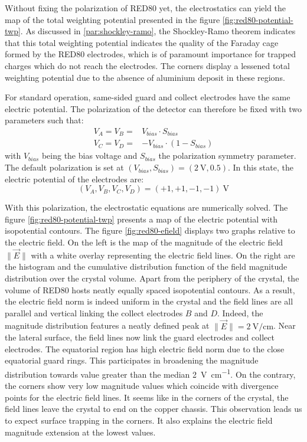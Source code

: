 Without fixing the polarization of RED80 yet, the electrostatics can yield the map of the total weighting potential presented in the figure \ref{fig:red80-potential-twp}.  As discussed in \ref{par:shockley-ramo}, the Shockley-Ramo theorem indicates that this total weighting potential indicates the quality of the Faraday cage formed by the RED80 electrodes, which is of paramount importance for trapped charges which do not reach the electrodes.
The corners display a lessened total weighting potential due to the absence of aluminium deposit in these regions.

For standard operation, same-sided guard and collect electrodes have the same electric potential. The polarization of the detector can therefore be fixed with two parameters such that:
\begin{align}
\label{eq:red80-polarization}
V_A = V_B = & V_{bias} \cdot S_{bias} \\
V_C = V_D = & - V_{bias} \cdot \left( 1 - S_{bias} \right)
\end{align}
with $V_{bias}$ being the bias voltage and $S_{bias}$ the polarization symmetry parameter.
The default polarization is set at $\left( V_{bias}, S_{bias} \right) = (\SI{2}{\volt}, 0.5)$. In this state, the electric potential of the electrodes are:
\begin{equation}
\label{eq:red80-default-polarization}
(V_A, V_B, V_C, V_D) = (+1, +1, -1, -1)\ \si{\volt}
\end{equation}

With this polarization, the electrostatic equations are numerically solved. The figure \ref{fig:red80-potential-twp} presents a map of the electric potential with isopotential contours. The  figure \ref{fig:red80-efield} displays two graphs relative to the electric field. On the left is the map of the magnitude of the electric field $\| \vec{E} \|$ with a white overlay representing the electric field lines. On the right are the histogram and the cumulative distribution function of the field magnitude distribution over the crystal volume.
Apart from the periphery of the crystal, the volume of RED80 hosts neatly equally spaced isopotential contours. As a result, the electric field norm is indeed uniform in the crystal and the field lines are all parallel and vertical linking the collect electrodes $B$ and $D$. Indeed, the magnitude distribution features a neatly defined peak at $\| \vec{E} \| = \SI{2}{\volt\per\centi\meter}$.
Near the lateral surface, the field lines now link the guard electrodes and collect electrodes. The equatorial region has high electric field norm due to the close equatorial guard rings. This participates in broadening the magnitude distribution towards value greater than the median \SI{2}{\volt\per\centi\meter}.
On the contrary, the corners show very low magnitude values which coincide with divergence points for the electric field lines. It seems like in the corners of the crystal, the field lines leave the crystal to end on the copper chassis. This observation leads us to expect surface trapping in the corners. It also explains the electric field magnitude extension at the lowest values.

